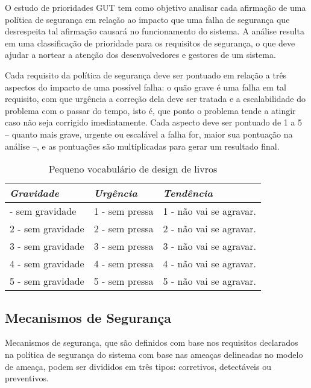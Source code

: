 \documentclass[
	10pt,				%
	openright,			%
	twoside,			%
	a5paper,			%
	english,			%
	french,				%
	spanish,			%
	brazil,				%
	sumario=tradicional
]{abntex2}
\begin{document}
O estudo de prioridades GUT tem como objetivo analisar cada afirmação de uma política de segurança em relação ao impacto que uma falha de segurança que desrespeita tal afirmação causará no funcionamento do sistema. A análise resulta em uma classificação de prioridade para os requisitos de segurança, o que deve ajudar a nortear a atenção dos desenvolvedores e gestores de um sistema.

Cada requisito da política de segurança deve ser pontuado em relação a três aspectos do impacto de uma possível falha: o quão grave é uma falha em tal requisito, com que urgência a correção dela deve ser tratada e a escalabilidade do problema com o passar do tempo, isto é, que ponto o problema tende a atingir caso não seja corrigido imediatamente. Cada aspecto deve ser pontuado de 1 a 5 – quanto mais grave, urgente ou escalável a falha for, maior sua pontuação na análise –, e as pontuações são multiplicadas para gerar um resultado final.

\begin{table}
\caption{Pequeno vocabulário de design de livros\label{vocabulario-texto}}
\ABNTEXfontereduzida
\begin{tabular}{p{4cm}p{4cm}p{4cm}}
\toprule
\textit{Gravidade} & \textit{Urgência} & \textit{Tendência}\\
\midrule
\ABNTEXfontereduzida
1 - sem gravidade & 1 - sem pressa & 1 - não vai se agravar.\\
2 - sem gravidade & 2 - sem pressa & 2 - não vai se agravar.\\
3 - sem gravidade & 3 - sem pressa & 3 - não vai se agravar.\\
4 - sem gravidade & 4 - sem pressa & 4 - não vai se agravar.\\
5 - sem gravidade & 5 - sem pressa & 5 - não vai se agravar.\\
\bottomrule
\end{tabular}
\end{table}

\subsection{Mecanismos de Segurança}

Mecanismos de segurança, que são definidos com base nos requisitos declarados na política de segurança do sistema com base nas ameaças delineadas no modelo de ameaça, podem ser divididos em três tipos: corretivos, detectáveis ou preventivos.
\end{document}
